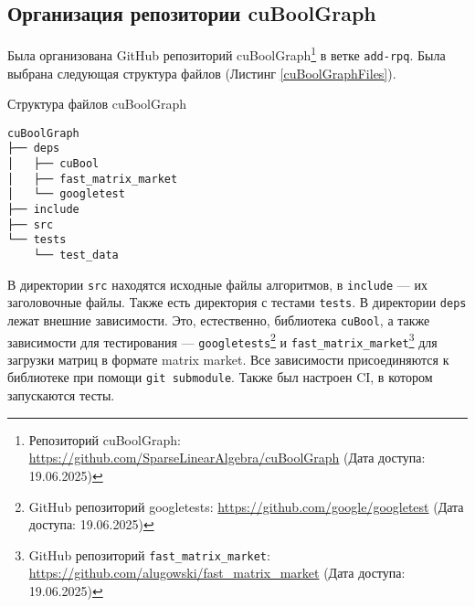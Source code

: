 \subsection{Организация репозитории cuBoolGraph}

Была организована GitHub репозиторий cuBoolGraph\footnote{Репозиторий cuBoolGraph: \url{https://github.com/SparseLinearAlgebra/cuBoolGraph} (Дата доступа: 19.06.2025)} в ветке \texttt{add-rpq}. Была выбрана следующая структура файлов (Листинг \ref{cuBoolGraphFiles}).

\begin{listing}[H]
    \caption{Структура файлов cuBoolGraph}
    \label{cuBoolGraphFiles}
    
    \begin{verbatim} 
cuBoolGraph
├── deps
│   ├── cuBool
│   ├── fast_matrix_market
│   └── googletest
├── include
├── src
└── tests
    └── test_data
   \end{verbatim}
\end{listing}

В директории \verb|src| находятся исходные файлы алгоритмов, в \verb|include| --- их заголовочные файлы. Также есть директория с тестами \verb|tests|. В директории \verb|deps| лежат внешние зависимости. Это, естественно, библиотека \verb|cuBool|, а также зависимости для тестирования --- \verb|googletests|\footnote{GitHub репозиторий googletests: \url{https://github.com/google/googletest} (Дата доступа: 19.06.2025)} и \verb|fast_matrix_market|\footnote{GitHub репозиторий \texttt{fast\_matrix\_market}: \url{https://github.com/alugowski/fast_matrix_market} (Дата доступа: 19.06.2025)} для загрузки матриц в формате matrix market. Все зависимости присоединяются к библиотеке при помощи \verb|git submodule|. Также был настроен CI, в котором запускаются тесты.

